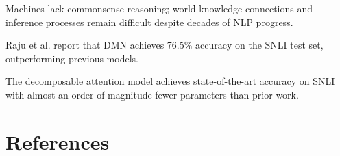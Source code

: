 \documentclass{article}\usepackage{amsmath,amssymb,graphicx,url}
\begin{document}
Machines lack commonsense reasoning; world-knowledge connections and inference processes remain difficult despite decades of NLP progress. \cite{storks2019recent}

Raju et al. report that DMN achieves 76.5\% accuracy on the SNLI test set, outperforming previous models. \cite{raju2017dynamic}

The decomposable attention model achieves state-of-the-art accuracy on SNLI with almost an order of magnitude fewer parameters than prior work. \cite{parikh2016decomposable}




\section*{References}
\end{document}
